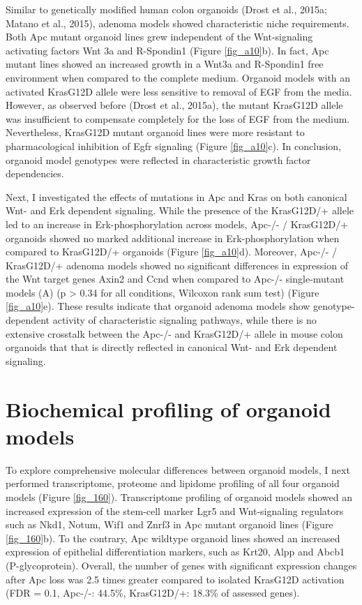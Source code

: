 \begin{flushleft}
Similar to genetically modified human colon organoids (Drost et al., 2015a; Matano et al., 2015), adenoma models showed characteristic niche requirements. Both Apc mutant organoid lines grew independent of the Wnt-signaling activating factors Wnt 3a and R-Spondin1 (Figure \ref{fig_a10}b). In fact, Apc mutant lines showed an increased growth in a Wnt3a and R-Spondin1 free environment when compared to the complete medium. 
Organoid models with an activated KrasG12D allele were less sensitive to removal of EGF from the media. However, as observed before (Drost et al., 2015a), the mutant KrasG12D allele was insufficient to compensate completely for the loss of EGF from the medium. Nevertheless, KrasG12D mutant organoid lines were more resistant to pharmacological inhibition of Egfr signaling (Figure \ref{fig_a10}c). In conclusion, organoid model genotypes were reflected in characteristic growth factor dependencies.


Next, I investigated the effects of mutations in Apc and Kras on both canonical Wnt- and Erk dependent signaling. While the presence of the KrasG12D/+ allele led to an increase in Erk-phosphorylation across models, Apc-/- / KrasG12D/+ organoids showed no marked additional increase in Erk-phosphorylation when compared to KrasG12D/+ organoids (Figure \ref{fig_a10}d). Moreover, Apc-/- / KrasG12D/+ adenoma models showed no significant differences in expression of the Wnt target genes Axin2 and Ccnd when compared to Apc-/- single-mutant models (A) (p > 0.34 for all conditions, Wilcoxon rank sum test) (Figure \ref{fig_a10}e). These results indicate that organoid adenoma models show genotype-dependent activity of characteristic signaling pathways, while there is no extensive crosstalk between the Apc-/-  and KrasG12D/+ allele in mouse colon organoids that that is directly reflected in canonical Wnt- and Erk dependent signaling.  

\bigbreak
\section{Biochemical profiling of organoid models}

To explore comprehensive molecular differences between organoid models, I next performed transcriptome, proteome and lipidome profiling of all four organoid models (Figure \ref{fig_160}). Transcriptome profiling of organoid models showed an increased expression of the stem-cell marker Lgr5 and Wnt-signaling regulators such as Nkd1, Notum, Wif1 and Znrf3 in Apc mutant organoid lines (Figure \ref{fig_160}b). To the contrary, Apc wildtype organoid lines showed an increased expression of epithelial differentiation markers, such as Krt20, Alpp and Abcb1 (P-glycoprotein). Overall, the number of genes with significant expression changes after Apc loss was 2.5 times greater compared to isolated KrasG12D activation (FDR = 0.1, Apc-/-: 44.5\%, KrasG12D/+: 18.3\% of assessed genes). 


\end{flushleft}
